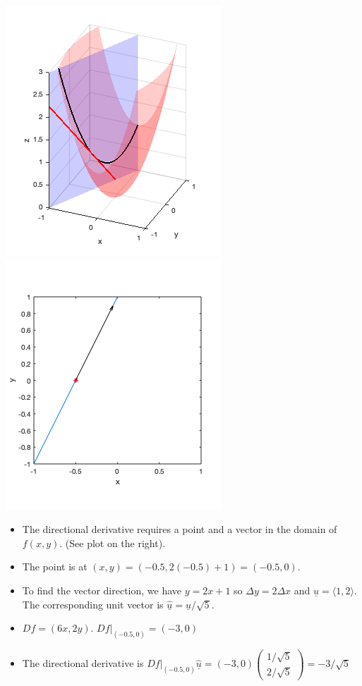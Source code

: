 \documentclass[12pt,letterpaper,noanswers]{exam}
\newcommand{\mb}[1]{\underline{#1}}
\begin{document}
\includegraphics[scale=0.5]{img/C09tangent.png}
\includegraphics[scale=0.5]{img/C09tangentxy.png}

\begin{itemize}
\itemsep0em
    \item The directional derivative requires a point and a vector in the domain of $f(x,y)$.  (See plot on the right).
    \item The point is at $(x,y) = (-0.5, 2(-0.5)+1) = (-0.5,0)$.
    \item To find the vector direction, we have $y = 2x+1$ so $\Delta y = 2\Delta x$ and $\mb{u} = \langle 1, 2\rangle$.  The corresponding unit vector is $\hat{\mb{u}} = \mb{u}/\sqrt{5}$.
    \item $Df = (6x, 2y)$. $\left.Df\right\vert_{(-0.5,0)} = (-3,0)$
    \item The directional derivative is $\left.Df\right\vert_{(-0.5,0)} \hat{\mb{u}} = (-3,0)\left(\begin{array}{c} 1/\sqrt{5} \\ 2/\sqrt{5} \end{array}\right) = -3/\sqrt{5}$
\end{itemize}
\end{document}
